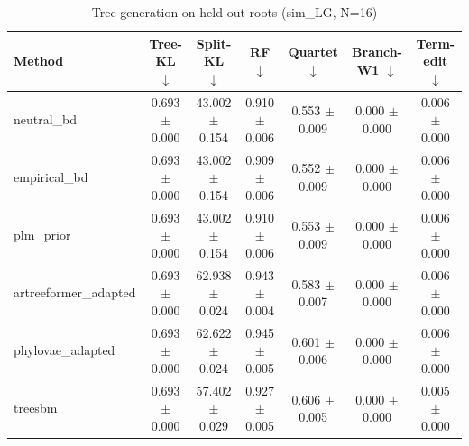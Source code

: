 \begin{table}[t]\centering
\caption{Tree generation on held-out roots (sim_LG, N=16)}
\begin{tabular}{lcccccc}
\toprule
Method & Tree-KL $\downarrow$ & Split-KL $\downarrow$ & RF $\downarrow$ & Quartet $\downarrow$ & Branch-W1 $\downarrow$ & Term-edit $\downarrow$ \\
\midrule
neutral\_bd & 0.693 $\pm$ 0.000 & 43.002 $\pm$ 0.154 & 0.910 $\pm$ 0.006 & 0.553 $\pm$ 0.009 & 0.000 $\pm$ 0.000 & 0.006 $\pm$ 0.000 \\
empirical\_bd & 0.693 $\pm$ 0.000 & 43.002 $\pm$ 0.154 & 0.909 $\pm$ 0.006 & 0.552 $\pm$ 0.009 & 0.000 $\pm$ 0.000 & 0.006 $\pm$ 0.000 \\
plm\_prior & 0.693 $\pm$ 0.000 & 43.002 $\pm$ 0.154 & 0.910 $\pm$ 0.006 & 0.553 $\pm$ 0.009 & 0.000 $\pm$ 0.000 & 0.006 $\pm$ 0.000 \\
artreeformer\_adapted & 0.693 $\pm$ 0.000 & 62.938 $\pm$ 0.024 & 0.943 $\pm$ 0.004 & 0.583 $\pm$ 0.007 & 0.000 $\pm$ 0.000 & 0.006 $\pm$ 0.000 \\
phylovae\_adapted & 0.693 $\pm$ 0.000 & 62.622 $\pm$ 0.024 & 0.945 $\pm$ 0.005 & 0.601 $\pm$ 0.006 & 0.000 $\pm$ 0.000 & 0.006 $\pm$ 0.000 \\
treesbm & 0.693 $\pm$ 0.000 & 57.402 $\pm$ 0.029 & 0.927 $\pm$ 0.005 & 0.606 $\pm$ 0.005 & 0.000 $\pm$ 0.000 & 0.005 $\pm$ 0.000 \\
\bottomrule
\end{tabular}
\end{table}